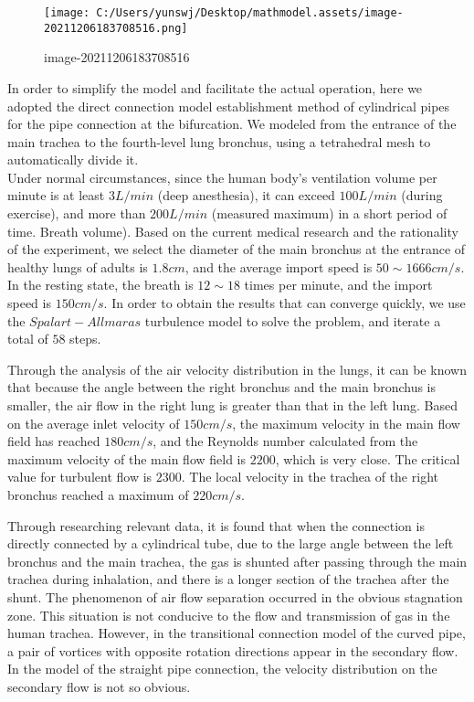 \documentclass[
]{article}
\begin{document}
\begin{figure}
\centering
\texttt{[image: C:/Users/yunswj/Desktop/mathmodel.assets/image-20211206183708516.png]}
\caption{image-20211206183708516}
\end{figure}

In order to simplify the model and facilitate the actual operation, here
we adopted the direct connection model establishment method of
cylindrical pipes for the pipe connection at the bifurcation. We modeled
from the entrance of the main trachea to the fourth-level lung bronchus,
using a tetrahedral mesh to automatically divide it.\\
Under normal circumstances, since the human body's ventilation volume
per minute is at least \(3 L/min\) (deep anesthesia), it can exceed
\(100 L/min\) (during exercise), and more than \(200 L/min\) (measured
maximum) in a short period of time. Breath volume). Based on the current
medical research and the rationality of the experiment, we select the
diameter of the main bronchus at the entrance of healthy lungs of adults
is \(1.8 cm\), and the average import speed is \(50\sim1666 cm/s\). In
the resting state, the breath is \(12\sim18\) times per minute, and the
import speed is \(150cm/s\). In order to obtain the results that can
converge quickly, we use the \(Spalart-Allmaras\) turbulence model to
solve the problem, and iterate a total of \(58\) steps.

Through the analysis of the air velocity distribution in the lungs, it
can be known that because the angle between the right bronchus and the
main bronchus is smaller, the air flow in the right lung is greater than
that in the left lung. Based on the average inlet velocity of
\(150 cm/s\), the maximum velocity in the main flow field has reached
\(180 cm/s\), and the Reynolds number calculated from the maximum
velocity of the main flow field is \(2200\), which is very close. The
critical value for turbulent flow is \(2300\). The local velocity in the
trachea of the right bronchus reached a maximum of \(220 cm/s\).

Through researching relevant data, it is found that when the connection
is directly connected by a cylindrical tube, due to the large angle
between the left bronchus and the main trachea, the gas is shunted after
passing through the main trachea during inhalation, and there is a
longer section of the trachea after the shunt. The phenomenon of air
flow separation occurred in the obvious stagnation zone. This situation
is not conducive to the flow and transmission of gas in the human
trachea. However, in the transitional connection model of the curved
pipe, a pair of vortices with opposite rotation directions appear in the
secondary flow. In the model of the straight pipe connection, the
velocity distribution on the secondary flow is not so obvious.
\end{document}
